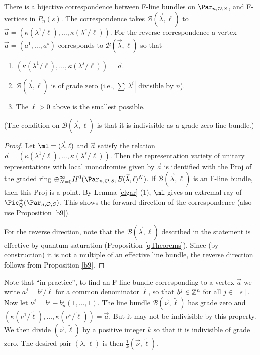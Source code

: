 \begin{lemma}
\notready\label{corresp}
There is a bijective correspondence between F-line bundles on $\Par_{n,\mathcal{O},S}$, and F-vertices in $P_n(s)$. The correspondence takes $\mathcal{B}(\vec{\lambda},\ell)$ to $\vec{a}=(\kappa(\lambda^1/\ell),\dots,\kappa(\lambda^s/\ell))$. For the reverse correspondence a vertex $\vec{a}=(a^1,\dots,a^s)$ corresponds to $\mathcal{B}(\vec{\lambda},\ell)$ so that
\begin{enumerate}
\item  $(\kappa(\lambda^1/\ell),\dots,\kappa(\lambda^s/\ell))=\vec{a}$.
\item $\mathcal{B}(\vec{\lambda},\ell)$ is of grade zero (i.e., $\sum |\lambda^i|$ divisible by $n$).
\item The $\ell>0$ above is the smallest possible.
\end{enumerate}
(The condition on $\mathcal{B}(\vec{\lambda},\ell)$ is that it is indivisible as a grade zero line bundle.)
\end{lemma}
\begin{proof}
Let $\ml=(\vec{\lambda},\ell)$ and $\vec{a}$ satisfy the relation $\vec{a}=(\kappa(\lambda^1/\ell),\dots,\kappa(\lambda^s/\ell))$. Then the representation variety of unitary representations with local monodromies given by $\vec{a}$ is identified with the Proj of the graded ring $\oplus_{N=0}^{\infty} H^0(\Par_{n,\mathcal{O},S}, \mathcal{B}(\vec{\lambda},\ell)^N)$. If $\mathcal{B}(\vec{\lambda},\ell)$
is an F-line bundle, then this Proj is a point.  By Lemma \ref{elgar} (1), $\ml$ gives an extremal ray  of $\Pic^+_{\Bbb{Q}}(\Par_{n,\mathcal{O},S})$. This shows the forward direction of the correspondence (also use Proposition \ref{b9}).

For the reverse direction, note that the $\mathcal{B}(\vec{\lambda},\ell)$ described in the statement is effective by quantum saturation (Proposition \ref{qTheorems}). Since (by construction) it is not a multiple of an effective line bundle, the reverse direction follows from Proposition \ref{b9}.
\end{proof}
\begin{remark}
\notready\label{inpractice}
Note that ``in practice'', to find an F-line bundle corresponding to a vertex $\vec{a}$ we write $a^j=b^j/\tilde{\ell}$ for a common denominator $\tilde{\ell}$, so that $b^j\in \Bbb{Z}^n$ for all $j\in[s]$. Now let $\nu^j=b^j-b^j_n(1,\dots,1)$.
The line bundle $\mathcal{B}(\vec{\nu},\tilde{\ell})$ has grade zero and $(\kappa(\nu^1/\tilde{\ell}),\dots,\kappa(\nu^s/\tilde{\ell}))=\vec{a}$. But it may not be indivisible by this property. We then divide $(\vec{\nu},\tilde{\ell})$ by a positive integer $k$ so that it is indivisible of grade zero. The desired pair $(\lambda,\ell)$ is then $\frac{1}{k}(\vec{\nu},\tilde{\ell})$.
\end{remark}

